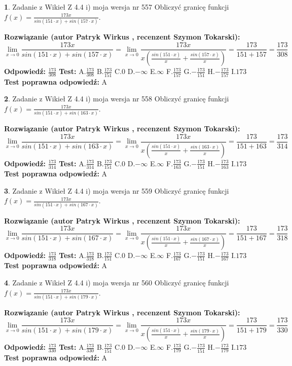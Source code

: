 \documentclass[12pt, a4paper]{article}
\theoremstyle{definition} %
\newtheorem{zad}{}
\newcommand{\zadStart}[1]{\begin{zad}#1\newline}
\newcommand{\zadStop}{\end{zad}}
\newcommand{\rozwStart}[2]{\noindent \textbf{Rozwiązanie (autor #1 , recenzent #2): }\newline}
\newcommand{\rozwStop}{\newline}
\newcommand{\odpStart}{\noindent \textbf{Odpowiedź:}\newline}
\newcommand{\odpStop}{\newline}
\newcommand{\testStart}{\noindent \textbf{Test:}\newline}
\newcommand{\testStop}{\newline}
\newcommand{\kluczStart}{\noindent \textbf{Test poprawna odpowiedź:}\newline}
\newcommand{\kluczStop}{\newline}
\begin{document}
\zadStart{Zadanie z Wikieł Z 4.4 i) moja wersja nr 557}
Obliczyć granicę funkcji $f(x)=\frac{173x}{sin(151\cdot x) +sin(157\cdot x)}$.
\zadStop
\rozwStart{Patryk Wirkus}{Szymon Tokarski}
$$\lim\limits_{x\to 0}\frac{173x}{sin(151\cdot x) +sin(157\cdot x)}=\lim\limits_{x\to 0}\frac{173x}{x(\frac{sin(151\cdot x)}{x}+\frac{sin(157\cdot x)}{x})}=\frac{173}{151+157} = \frac{173}{308}$$
\rozwStop
\odpStart
$\frac{173}{308}$
\odpStop
\testStart
A.$\frac{173}{308}$
B.$\frac{173}{151}$
C.$0$
D.$-\infty$
E.$\infty$
F.$\frac{173}{157}$
G.$-\frac{173}{151}$
H.$-\frac{173}{157}$
I.$173$
\testStop
\kluczStart
A
\kluczStop



\zadStart{Zadanie z Wikieł Z 4.4 i) moja wersja nr 558}
Obliczyć granicę funkcji $f(x)=\frac{173x}{sin(151\cdot x) +sin(163\cdot x)}$.
\zadStop
\rozwStart{Patryk Wirkus}{Szymon Tokarski}
$$\lim\limits_{x\to 0}\frac{173x}{sin(151\cdot x) +sin(163\cdot x)}=\lim\limits_{x\to 0}\frac{173x}{x(\frac{sin(151\cdot x)}{x}+\frac{sin(163\cdot x)}{x})}=\frac{173}{151+163} = \frac{173}{314}$$
\rozwStop
\odpStart
$\frac{173}{314}$
\odpStop
\testStart
A.$\frac{173}{314}$
B.$\frac{173}{151}$
C.$0$
D.$-\infty$
E.$\infty$
F.$\frac{173}{163}$
G.$-\frac{173}{151}$
H.$-\frac{173}{163}$
I.$173$
\testStop
\kluczStart
A
\kluczStop



\zadStart{Zadanie z Wikieł Z 4.4 i) moja wersja nr 559}
Obliczyć granicę funkcji $f(x)=\frac{173x}{sin(151\cdot x) +sin(167\cdot x)}$.
\zadStop
\rozwStart{Patryk Wirkus}{Szymon Tokarski}
$$\lim\limits_{x\to 0}\frac{173x}{sin(151\cdot x) +sin(167\cdot x)}=\lim\limits_{x\to 0}\frac{173x}{x(\frac{sin(151\cdot x)}{x}+\frac{sin(167\cdot x)}{x})}=\frac{173}{151+167} = \frac{173}{318}$$
\rozwStop
\odpStart
$\frac{173}{318}$
\odpStop
\testStart
A.$\frac{173}{318}$
B.$\frac{173}{151}$
C.$0$
D.$-\infty$
E.$\infty$
F.$\frac{173}{167}$
G.$-\frac{173}{151}$
H.$-\frac{173}{167}$
I.$173$
\testStop
\kluczStart
A
\kluczStop



\zadStart{Zadanie z Wikieł Z 4.4 i) moja wersja nr 560}
Obliczyć granicę funkcji $f(x)=\frac{173x}{sin(151\cdot x) +sin(179\cdot x)}$.
\zadStop
\rozwStart{Patryk Wirkus}{Szymon Tokarski}
$$\lim\limits_{x\to 0}\frac{173x}{sin(151\cdot x) +sin(179\cdot x)}=\lim\limits_{x\to 0}\frac{173x}{x(\frac{sin(151\cdot x)}{x}+\frac{sin(179\cdot x)}{x})}=\frac{173}{151+179} = \frac{173}{330}$$
\rozwStop
\odpStart
$\frac{173}{330}$
\odpStop
\testStart
A.$\frac{173}{330}$
B.$\frac{173}{151}$
C.$0$
D.$-\infty$
E.$\infty$
F.$\frac{173}{179}$
G.$-\frac{173}{151}$
H.$-\frac{173}{179}$
I.$173$
\testStop
\kluczStart
A
\kluczStop
\end{document}
